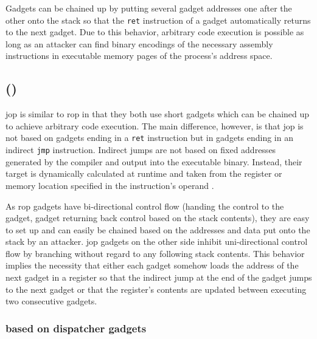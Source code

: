 Gadgets can be chained up by putting several gadget addresses one after the other onto the stack so that the \texttt{ret} instruction of a gadget automatically returns to the next gadget.
Due to this behavior, arbitrary code execution is possible as long as an attacker can find binary encodings of the necessary assembly instructions in executable memory pages of the process's address space.

\subsection{ ()}
\label{subsec:cr-jop}

\gls{jop} is similar to \gls{rop} in that they both use short gadgets which can be chained up to achieve arbitrary code execution.
The main difference, however, is that \gls{jop} is not based on gadgets ending in a \texttt{ret} instruction but in gadgets ending in an indirect \texttt{jmp} instruction.
Indirect jumps are not based on fixed addresses generated by the compiler and output into the executable binary.
Instead, their target is dynamically calculated at runtime and taken from the register or memory location specified in the instruction's operand \cite[3-517\psqq]{IntelCorporation2020}.

As \gls{rop} gadgets have bi-directional control flow (handing the control to the gadget, gadget returning back control based on the stack contents), they are easy to set up and can easily be chained based on the addresses and data put onto the stack by an attacker.
\gls{jop} gadgets on the other side inhibit uni-directional control flow by branching without regard to any following stack contents.
This behavior implies the necessity that either each gadget somehow loads the address of the next gadget in a register so that the indirect jump at the end of the gadget jumps to the next gadget or that the register's contents are updated between executing two consecutive gadgets.


\subsubsection{ based on dispatcher gadgets}
\label{subsubsec:cr-jop-dispatcher}

